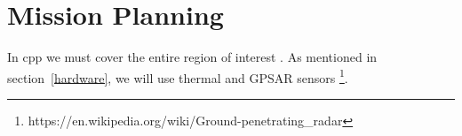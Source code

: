 \newpage
{}
\section{Mission Planning} \label{missionplanning}

In \gls{cpp} we must cover the entire region of interest \cite{cabreira2019cpp}. As mentioned in section~\ref{hardware}, we will use thermal and GPSAR sensors \footnote{https://en.wikipedia.org/wiki/Ground-penetrating\_radar}.